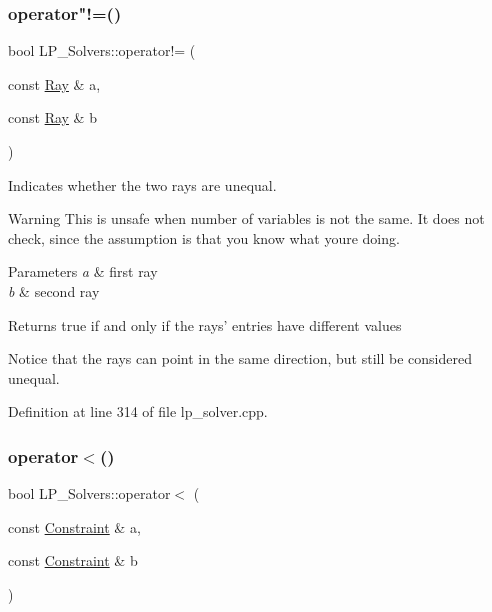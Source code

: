 \subsubsection{\texorpdfstring{operator"!=()}{operator!=()}\hspace{0.1cm}{\footnotesize\ttfamily [2/2]}}
{\footnotesize\ttfamily bool L\+P\+\_\+\+Solvers\+::operator!= (\begin{DoxyParamCaption}\item[{const \hyperlink{group___c_l_s_solvers_class_l_p___solvers_1_1_ray}{Ray} \&}]{a,  }\item[{const \hyperlink{group___c_l_s_solvers_class_l_p___solvers_1_1_ray}{Ray} \&}]{b }\end{DoxyParamCaption})}



Indicates whether the two rays are unequal. 

\begin{DoxyWarning}{Warning}
This is unsafe when number of variables is not the same. It does not check, since the assumption is that you know what you\textquotesingle{}re doing. 
\end{DoxyWarning}

\begin{DoxyParams}{Parameters}
{\em a} & first ray \\
\hline
{\em b} & second ray \\
\hline
\end{DoxyParams}
\begin{DoxyReturn}{Returns}
{\ttfamily true} if and only if the rays' entries have different values
\end{DoxyReturn}
Notice that the rays can point in the same direction, but still be considered unequal. 

Definition at line 314 of file lp\+\_\+solver.\+cpp.

\mbox{\label{namespace_l_p___solvers_a28f6cde3df8ed19a4195584ace43c9d9}} 
\subsubsection{\texorpdfstring{operator$<$()}{operator<()}\hspace{0.1cm}{\footnotesize\ttfamily [1/3]}}
{\footnotesize\ttfamily bool L\+P\+\_\+\+Solvers\+::operator$<$ (\begin{DoxyParamCaption}\item[{const \hyperlink{group___c_l_s_solvers_class_l_p___solvers_1_1_constraint}{Constraint} \&}]{a,  }\item[{const \hyperlink{group___c_l_s_solvers_class_l_p___solvers_1_1_constraint}{Constraint} \&}]{b }\end{DoxyParamCaption})}



